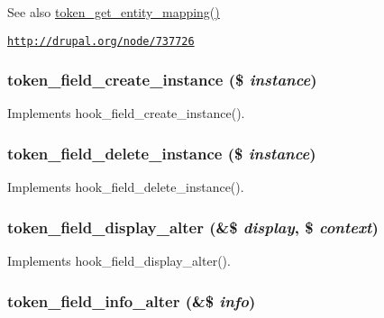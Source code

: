 \begin{DoxySeeAlso}{See also}
\hyperlink{token_8module_a44ada8bf0431313606adce0148b29b82}{token\_\-get\_\-entity\_\-mapping()} 

\href{http://drupal.org/node/737726}{\tt http://drupal.org/node/737726} 
\end{DoxySeeAlso}
\hypertarget{token_8module_a33b88bb88f338a9d37ea10b260caac36}{
\subsubsection[{token\_\-field\_\-create\_\-instance}]{\setlength{\rightskip}{0pt plus 5cm}token\_\-field\_\-create\_\-instance (\$ {\em instance})}}
\label{token_8module_a33b88bb88f338a9d37ea10b260caac36}
Implements hook\_\-field\_\-create\_\-instance(). \hypertarget{token_8module_aabb4f403262fe33845a9644fef38feb4}{
\subsubsection[{token\_\-field\_\-delete\_\-instance}]{\setlength{\rightskip}{0pt plus 5cm}token\_\-field\_\-delete\_\-instance (\$ {\em instance})}}
\label{token_8module_aabb4f403262fe33845a9644fef38feb4}
Implements hook\_\-field\_\-delete\_\-instance(). \hypertarget{token_8module_a27b0b8c059ec8a469a124e574ac1a9bc}{
\subsubsection[{token\_\-field\_\-display\_\-alter}]{\setlength{\rightskip}{0pt plus 5cm}token\_\-field\_\-display\_\-alter (\&\$ {\em display}, \/  \$ {\em context})}}
\label{token_8module_a27b0b8c059ec8a469a124e574ac1a9bc}
Implements hook\_\-field\_\-display\_\-alter(). \hypertarget{token_8module_af9c21176f345bfcac32fc7628f06bc1a}{
\subsubsection[{token\_\-field\_\-info\_\-alter}]{\setlength{\rightskip}{0pt plus 5cm}token\_\-field\_\-info\_\-alter (\&\$ {\em info})}}
